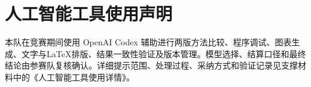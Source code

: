 \section{人工智能工具使用声明}
本队在竞赛期间使用 OpenAI Codex 辅助进行两版方法比较、程序调试、图表生成、文字与LaTeX排版、结果一致性验证及版本管理。模型选择、结算口径和最终结论由参赛队复核确认。详细提示范围、处理过程、采纳方式和验证记录见支撑材料中的《人工智能工具使用详情》。
